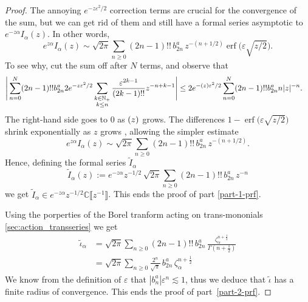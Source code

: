 \documentclass{article}
\let\Re\relax
\DeclareMathOperator{\Re}{Re}
\newcommand{\C}{\mathbb{C}}
\theoremstyle{definition}
\theoremstyle{plain}
\begin{document}
\begin{proof}
The annoying $e^{-z\varepsilon^2/2}$ correction terms are crucial for the convergence of the sum, but we can get rid of them and still have a formal series asymptotic to $e^{-z \alpha} I_\alpha(z)$. In other words,
\[ e^{z \alpha} I_\alpha(z) \sim \sqrt{2\pi} \sum_{n \ge 0} (2n-1)!!\,b_{2n}^a\,z^{-(n+1/2)} \operatorname{erf}\big(\varepsilon \sqrt{z/2}\big). \]
To see why, cut the sum off after $N$ terms, and observe that
\begin{align*}
  \Bigg | \sum_{n= 0}^N(2n-1)!! b_{2n}^a  2e^{-z\varepsilon^2/2} \sum_{\substack{k \in \mathbb{N}_+ \\ k \le n}} \frac{\varepsilon^{2k-1}}{(2k-1)!!} z^{-n+k-1} \Bigg | &\leq  2 e^{-\Re (z) \varepsilon^2/2} \sum_{n=0}^N(2n-1)!! b_{2n}^a n|z|^{-n}.
\end{align*}
The right-hand side goes to $0$ as $\Re(z)$ grows.
The differences $1 - \operatorname{erf}\big(\varepsilon \sqrt{z/2}\big)$ shrink exponentially as $z$ grows \cite[inequality~(5)]{chiani-dardari-book}, allowing the simpler estimate
\[ e^{z\alpha} I_\alpha(z) \sim \sqrt{2\pi} \sum_{n \ge 0} (2n-1)!!\, b_{2n}^a \,z^{-(n+1/2)}. \]
Hence, defining the formal series $\tilde{I}_\alpha$
\[\tilde{I}_\alpha(z):=e^{-z\alpha} z^{-1/2}\, \sqrt{2\pi} \sum_{n \ge 0} (2n-1)!!\, b_{2n}^a \,z^{-n}\]
we get $\tilde{I}_\alpha\in e^{-z\alpha}z^{-1/2}\C\llbracket z^{-1}\rrbracket$. This ends the proof of part \ref{part-1-prf}.

Using the porperties of the Borel tranform acting on trans-mononials \ref{sec:action_transseries} we get 
\begin{align*}
\tilde{\iota}_\alpha & = \sqrt{2\pi} \sum_{n \ge 0} (2n - 1)!! \,b_{2n}^a\,\frac{\zeta_\alpha^{n+\tfrac{1}{2}}}{\Gamma(n+\tfrac{1}{2})} \\
&= \sqrt{2\pi} \sum_{n \ge 0} \frac{2^n}{\sqrt{\pi}} \,b_{2n}^a\,\zeta_\alpha^{n+\tfrac{1}{2}}
\end{align*}
We know from the definition of $\varepsilon$ that $\left|b_n^a\right| \varepsilon^n \lesssim 1$, thus we deduce that $\tilde{\iota}$ has a finite radius of convergence. This ends the proof of part~\ref{part-2-prf}. %


\end{proof}
\end{document}
